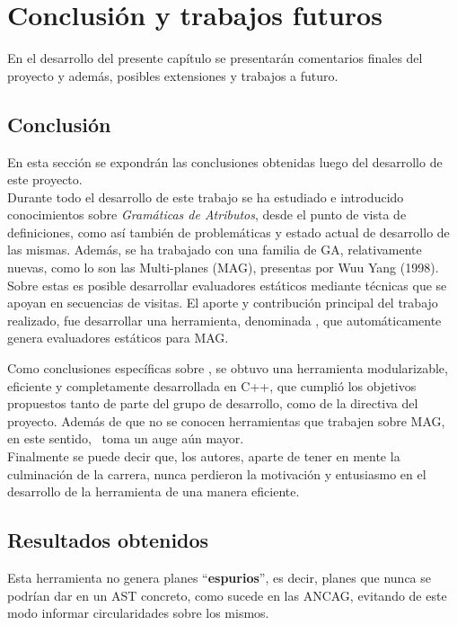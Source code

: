 \chapter{Conclusión y trabajos futuros}
\label{chap:conclusiones}

\minitoc

En el desarrollo del presente capítulo se presentarán comentarios finales del proyecto y además, posibles extensiones y trabajos a futuro.

\section{Conclusión}

En esta sección se expondrán las conclusiones obtenidas luego del desarrollo de este proyecto.\\

Durante todo el desarrollo de este trabajo se ha estudiado e introducido conocimientos sobre \textit{Gramáticas de Atributos}, desde el punto de vista de definiciones, como así también de problemáticas y estado actual de desarrollo de las mismas. Además, se ha trabajado con una familia de GA, relativamente nuevas, como lo son las Multi-planes (MAG), presentas por Wuu Yang (1998). Sobre estas es posible desarrollar evaluadores estáticos mediante técnicas que se apoyan en secuencias de visitas. El aporte y contribución principal del trabajo realizado, fue desarrollar una herramienta, denominada \maggen, que automáticamente genera evaluadores estáticos para MAG.

Como conclusiones específicas sobre \maggen, se obtuvo una herramienta modularizable, eficiente y completamente desarrollada en C++, que cumplió los objetivos propuestos tanto de parte del grupo de desarrollo, como de la directiva del proyecto. Además de que no se conocen herramientas que trabajen sobre MAG, en este sentido, \maggen\ toma un auge aún mayor.\\

Finalmente se puede decir que, los autores, aparte de tener en mente la culminación de la carrera, nunca perdieron la motivación y entusiasmo en el desarrollo de la herramienta de una manera eficiente.

\section{Resultados obtenidos}

Esta herramienta no genera planes ``\textbf{espurios}'', es decir, planes que nunca se podrían dar en un AST concreto, como sucede en las ANCAG, evitando de este modo informar circularidades sobre los mismos.

